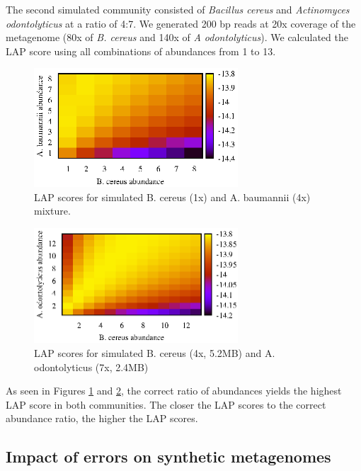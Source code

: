 \documentclass[conference]{IEEEtran}
\begin{document}
The second simulated community consisted of \emph{Bacillus cereus} and \emph{Actinomyces odontolyticus} at a ratio of 4:7.
We generated 200 bp reads at 20x coverage of the metagenome (80x of \emph{B. cereus} and 140x of \emph{A odontolyticus}).
We calculated the LAP score using all combinations of abundances from 1 to 13.

\begin{figure}[!t]
\centering
\includegraphics[width=3in]{ref_abun_1}
\caption{LAP scores for simulated B. cereus (1x) and A. baumannii (4x) mixture.}
\label{fig:ref_abun}
\end{figure}

\begin{figure}[!t]
\centering
\includegraphics[width=3in]{ref_abun_2}
\caption{LAP scores for simulated B. cereus (4x, 5.2MB) and A. odontolyticus (7x, 2.4MB)}
\label{fig:ref_abun_2}
\end{figure}


As seen in Figures \ref{fig:ref_abun} and \ref{fig:ref_abun_2}, the correct ratio of abundances yields the highest LAP score in both communities.
The closer the LAP scores to the correct abundance ratio, the higher the LAP scores.

\subsection{Impact of errors on synthetic metagenomes}
\end{document}
